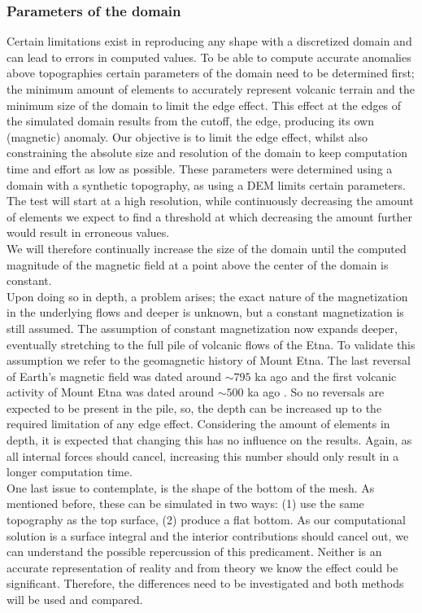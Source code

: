 \subsubsection{Parameters of the domain}
Certain limitations exist in reproducing any shape with a discretized domain and can lead to errors in computed values. To be able to compute accurate anomalies above topographies certain parameters of the domain need to be determined first; the minimum amount of elements to accurately represent volcanic terrain and the minimum size of the domain to limit the edge effect. This effect at the edges of the simulated domain results from the cutoff, the edge, producing its own (magnetic) anomaly. Our objective is to limit the edge effect, whilst also constraining the absolute size and resolution of the domain to keep computation time and effort as low as possible. These parameters were determined using a domain with a synthetic topography, as using a DEM limits certain parameters. 
The test will start at a high resolution, while continuously decreasing the amount of elements we expect to find a threshold at which decreasing the amount further would result in erroneous values. \\  We will therefore continually increase the size of the domain until the computed magnitude of the magnetic field at a point above the center of the domain is constant. \\ Upon doing so in depth, a problem arises; the exact nature of the magnetization in the underlying flows and deeper is unknown, but a constant magnetization is still assumed. The assumption of constant magnetization now expands deeper, eventually stretching to the full pile of volcanic flows of the Etna. To validate this assumption we refer to the geomagnetic history of Mount Etna. The last reversal of Earth's magnetic field was dated around $\sim795$ ka ago \parencite{Singer19} and the first volcanic activity of Mount Etna was dated around $\sim500$ ka ago \parencite{Branca08}. So no reversals are expected to be present in the pile, so, the depth can be increased up to the required limitation of any edge effect. Considering the amount of elements in depth, it is expected that changing this has no influence on the results. Again, as all internal forces should cancel, increasing this number should only result in a longer computation time.
\\ One last issue to contemplate, is the shape of the bottom of the mesh. As mentioned before, these can be simulated in two ways: (1) use the same topography as the top surface, (2) produce a flat bottom. As our computational solution is a surface integral and the interior contributions should cancel out, we can understand the possible repercussion of this predicament. Neither is an accurate representation of reality and from theory we know the effect could be significant. Therefore, the differences need to be investigated and both methods will be used and compared.  



